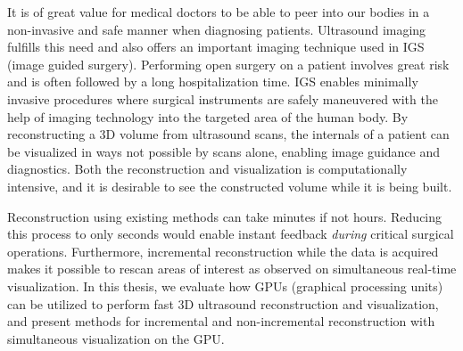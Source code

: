 It is of great value for medical doctors to be able to peer into our bodies in a non-invasive and safe manner when diagnosing patients. Ultrasound imaging fulfills this need and also offers an important imaging technique used in IGS (image guided surgery). Performing open surgery on a patient involves great risk and is often followed by a long hospitalization time. IGS enables minimally invasive procedures where surgical instruments are safely maneuvered with the help of imaging technology into the targeted area of the human body. By reconstructing a 3D volume from ultrasound scans, the internals of a patient can be visualized in ways not possible by scans alone, enabling image guidance and diagnostics. Both the reconstruction and visualization is computationally intensive, and it is desirable to see the constructed volume while it is being built.

Reconstruction using existing methods can take minutes if not hours. Reducing this process to only seconds would enable instant feedback \emph{during} critical surgical operations. Furthermore, incremental reconstruction while the data is acquired makes it possible to rescan areas of interest as observed on simultaneous real-time visualization. In this thesis, we evaluate how GPUs (graphical processing units) can be utilized to perform fast 3D ultrasound reconstruction and visualization, and present methods for incremental and non-incremental reconstruction with simultaneous visualization on the GPU.